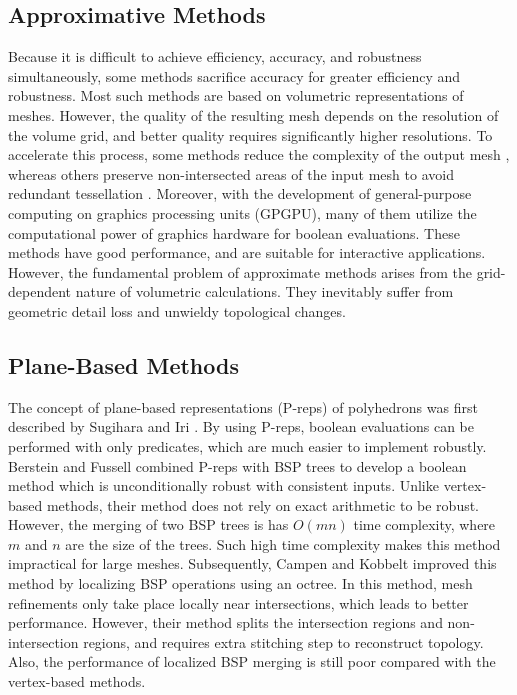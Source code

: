 \subsection{Approximative Methods}


Because it is difficult to achieve efficiency, accuracy, and robustness simultaneously, some methods sacrifice accuracy for greater efficiency and robustness. Most such methods are based on volumetric representations of meshes. However, the quality of the resulting mesh depends on the resolution of the volume grid, and better quality requires significantly higher resolutions.
To accelerate this process, some methods reduce the complexity of the output mesh \cite{varadhan2004topology}, whereas others preserve non-intersected areas of the input mesh to avoid redundant tessellation \cite{pavic2010hybrid,wang2011approximate,zhao2011parallel,hable2005blister,ogayar2006gpu,updegrove2016boolean}.
Moreover, with the development of general-purpose computing on graphics processing units (GPGPU), many of them utilize the computational power of graphics hardware for boolean evaluations. These methods have good performance, and are suitable for interactive applications. However, the fundamental problem of approximate methods arises from the grid-dependent nature of volumetric calculations. They inevitably suffer from geometric detail loss and unwieldy topological changes.


\subsection{Plane-Based Methods}
\label{sec:pbrelated}

The concept of plane-based representations (P-reps) of polyhedrons was first described by Sugihara and Iri \cite{sugihara1990solid}. By using P-reps, boolean evaluations can be performed with only predicates, which are much easier to implement robustly. Berstein and Fussell \cite{bernstein2009fast} combined P-reps with BSP trees \cite{thibault1987set,naylor1990merging} to develop a boolean method which is unconditionally robust with consistent inputs. Unlike vertex-based methods, their method does not rely on exact arithmetic to be robust.
However, the merging of two BSP trees is has $O(mn)$ time complexity, where $m$ and $n$ are the size of the trees. Such high time complexity makes this method impractical for large meshes. Subsequently, Campen and Kobbelt \cite{campen2010exact} improved this method by localizing BSP operations using an octree. In this method, mesh refinements only take place locally near intersections, which leads to better performance. However, their method splits the intersection regions and non-intersection regions, and requires extra stitching step to reconstruct topology. Also, the performance of localized BSP merging is still poor compared with the vertex-based methods.
